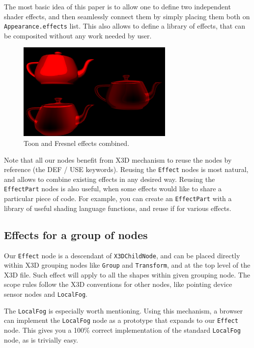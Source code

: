 \documentclass{acmsiggraph}                     %
\begin{document}
\needspace{1in}
The most basic idea of this paper is to allow one to define two
independent shader effects, and then seamlessly connect them by simply
placing them both on \texttt{Appearance.effects} list. This also allows to
define a library of effects, that can be composited without any work
needed by user.

\begin{figure}[H]
  \centering
  \includegraphics[width=3in]{fresnel_and_toon}
  \caption{Toon and Fresnel effects combined.}
\end{figure}

Note that all our nodes benefit from X3D mechanism to reuse the nodes
by reference (the DEF / USE keywords). Reusing the \texttt{Effect} nodes
is most natural, and allows to combine existing effects in any desired way.
Reusing the \texttt{EffectPart} nodes is also useful, when some effects
would like to share a particular piece of code. For example,
you can create an \texttt{EffectPart} with a library of useful
shading language functions, and reuse if for various effects.

\subsection{Effects for a group of nodes}

Our \texttt{Effect} node is a descendant of \texttt{X3DChildNode},
and can be placed directly within X3D grouping nodes like
\texttt{Group} and \texttt{Transform}, and at the top level of the X3D file.
Such effect will apply to all the shapes within given grouping node.
The scope rules follow the X3D conventions for other nodes,
like pointing device sensor nodes and \texttt{LocalFog}.

The \texttt{LocalFog} is especially worth mentioning. Using this mechanism,
a browser can implement the \texttt{LocalFog} node as a prototype
that expands to our \texttt{Effect} node. This gives you a 100\% correct
implementation of the standard \texttt{LocalFog} node, as is trivially easy.
\end{document}
